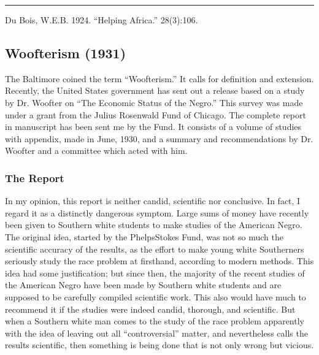 \documentclass[letterpaper,10pt,english]{jupyterBook}
\begin{document}
\bigskip\hrule\bigskip


\sphinxAtStartPar
{} Du Bois, W.E.B. 1924. “Helping Africa.” 28(3):106.


\subsection{Woofterism  (1931)}
\label{\detokenize{Volumes/38/03/woofterism:woofterism-1931}}\label{\detokenize{Volumes/38/03/woofterism::doc}}
\sphinxAtStartPar
The Baltimore  coined the term “Woofterism.” It calls for definition and extension. Recently, the United States government has sent out a release based on a study by Dr. Woofter on “The Economic Status of the Negro.” This survey was made under a grant from the Julius Rosenwald Fund of Chicago. The complete report in manuscript has been sent me by the Fund. It consists of a volume of studies with appendix, made in June, 1930, and a summary and recommendations by Dr. Woofter and a committee which acted with him.


\subsubsection{The Report}
\label{\detokenize{Volumes/38/03/woofterism:the-report}}
\sphinxAtStartPar
In my opinion, this report is neither candid, scientific nor conclusive. In fact, I regard it as a distinctly dangerous symptom. Large sums of money have recently been given to Southern white students to make studies of the American Negro. The original idea, started by the Phelps\sphinxhyphen{}Stokes Fund, was not so much the scientific accuracy of the results, as the effort to make young white Southerners seriously study the race problem at first\sphinxhyphen{}hand, according to modern methods. This idea had some justification; but since then, the majority of the recent studies of the American Negro have been made by Southern white students and are supposed to be carefully compiled scientific work. This also would have much to recommend it if the studies were indeed candid, thorough, and scientific. But when a Southern white man comes to the study of the race problem apparently with the idea of leaving out all “controversial” matter, and nevertheless calls the results scientific, then something is being done that is not only wrong but vicious.
\end{document}
